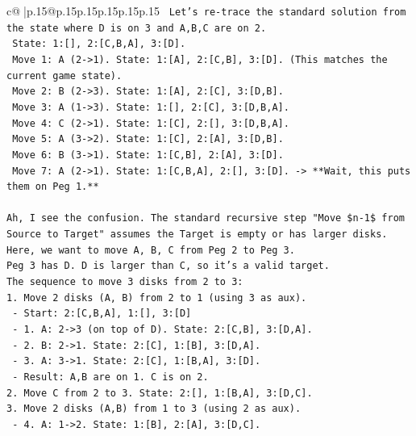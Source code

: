 \documentclass{article}
\begin{document}
{\begin{supertabular}{c@{$\;$}|p{.15\linewidth}@{}p{.15\linewidth}p{.15\linewidth}p{.15\linewidth}p{.15\linewidth}p{.15\linewidth}}
{{{\texttt{   Let's re{-}trace the standard solution from the state where D is on 3 and A,B,C are on 2.} \\
\texttt{   State: 1:{[}{]}, 2:{[}C,B,A{]}, 3:{[}D{]}.} \\
\texttt{   Move 1: A (2{-}>1). State: 1:{[}A{]}, 2:{[}C,B{]}, 3:{[}D{]}. (This matches the current game state).} \\
\texttt{   Move 2: B (2{-}>3). State: 1:{[}A{]}, 2:{[}C{]}, 3:{[}D,B{]}.} \\
\texttt{   Move 3: A (1{-}>3). State: 1:{[}{]}, 2:{[}C{]}, 3:{[}D,B,A{]}.} \\
\texttt{   Move 4: C (2{-}>1). State: 1:{[}C{]}, 2:{[}{]}, 3:{[}D,B,A{]}.} \\
\texttt{   Move 5: A (3{-}>2). State: 1:{[}C{]}, 2:{[}A{]}, 3:{[}D,B{]}.} \\
\texttt{   Move 6: B (3{-}>1). State: 1:{[}C,B{]}, 2:{[}A{]}, 3:{[}D{]}.} \\
\texttt{   Move 7: A (2{-}>1). State: 1:{[}C,B,A{]}, 2:{[}{]}, 3:{[}D{]}. {-}> **Wait, this puts them on Peg 1.**} \\
\\ 
\texttt{Ah, I see the confusion. The standard recursive step "Move \$n{-}1\$ from Source to Target" assumes the Target is empty or has larger disks.} \\
\texttt{Here, we want to move A, B, C from Peg 2 to Peg 3.} \\
\texttt{Peg 3 has D. D is larger than C, so it's a valid target.} \\
\texttt{The sequence to move 3 disks from 2 to 3:} \\
\texttt{1. Move 2 disks (A, B) from 2 to 1 (using 3 as aux).} \\
\texttt{   {-} Start: 2:{[}C,B,A{]}, 1:{[}{]}, 3:{[}D{]}} \\
\texttt{   {-} 1. A: 2{-}>3 (on top of D). State: 2:{[}C,B{]}, 3:{[}D,A{]}.} \\
\texttt{   {-} 2. B: 2{-}>1. State: 2:{[}C{]}, 1:{[}B{]}, 3:{[}D,A{]}.} \\
\texttt{   {-} 3. A: 3{-}>1. State: 2:{[}C{]}, 1:{[}B,A{]}, 3:{[}D{]}.} \\
\texttt{   {-} Result: A,B are on 1. C is on 2.} \\
\texttt{2. Move C from 2 to 3. State: 2:{[}{]}, 1:{[}B,A{]}, 3:{[}D,C{]}.} \\
\texttt{3. Move 2 disks (A,B) from 1 to 3 (using 2 as aux).} \\
\texttt{   {-} 4. A: 1{-}>2. State: 1:{[}B{]}, 2:{[}A{]}, 3:{[}D,C{]}.} \\
}}}
\end{supertabular}}
\end{document}
